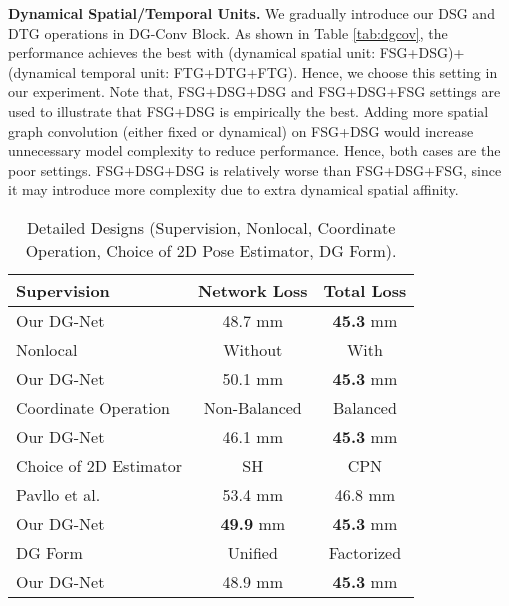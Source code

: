 \documentclass[journal]{IEEEtran}
\begin{document}
\textbf{
Dynamical Spatial/Temporal Units.}
We gradually introduce our DSG and DTG operations in DG-Conv Block.
As shown in Table \ref{tab:dgcov},
the performance achieves the best with
(dynamical spatial unit: FSG+DSG)+(dynamical temporal unit: FTG+DTG+FTG).
Hence,
we choose this setting in our experiment.
 Note that,   FSG+DSG+DSG and FSG+DSG+FSG settings are used to illustrate that FSG+DSG is empirically the best. Adding more spatial graph convolution (either fixed or dynamical) on FSG+DSG would increase unnecessary model complexity to reduce performance. Hence, both cases are the poor settings. FSG+DSG+DSG is relatively worse than FSG+DSG+FSG, since it may introduce more complexity due to extra dynamical spatial affinity.






\begin{table}[t]
\begin{center}
\begin{tabular}{l|c|c}
\hline\hline
Supervision            & Network Loss   & Total Loss     \\
\hline
Our DG-Net             &    48.7  mm      &    \textbf{45.3}  mm     \\
\hline\hline
Nonlocal               & Without   & With     \\
\hline
Our DG-Net             &  50.1  mm        & \textbf{45.3}   mm       \\
\hline\hline
Coordinate Operation   & Non-Balanced   & Balanced    \\
\hline
Our DG-Net             &   46.1   mm      &  \textbf{45.3}   mm      \\
\hline\hline
Choice of 2D Estimator &SH \cite{alej2016stacked} &  CPN \cite{cpn}    \\\hline
Pavllo et al.\cite{pavllo:videopose3d:2019} &53.4  mm &46.8 mm\\
Our DG-Net             &   \textbf{49.9} mm     &\textbf{45.3}  mm         \\
\hline\hline
DG Form   & Unified   & Factorized    \\
\hline
Our DG-Net             &   48.9   mm      &  \textbf{45.3}   mm      \\
\hline\hline
\end{tabular}\caption{Detailed Designs (Supervision, Nonlocal, Coordinate Operation, Choice of 2D Pose Estimator, DG Form).}
\label{tab:detail}
\end{center}
\vspace{-0.5cm}
\end{table}
\end{document}
